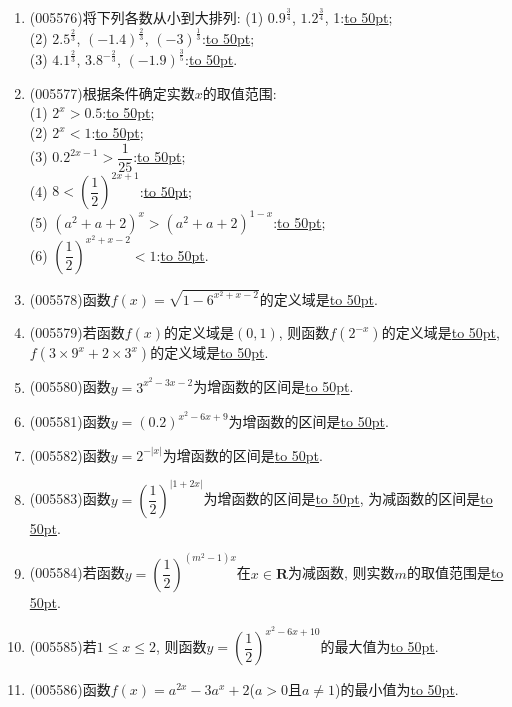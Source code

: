 \documentclass[10pt,a4paper]{article}
\newcommand{\blank}[1]{\underline{\hbox to #1pt{}}}
\begin{document}
\begin{enumerate}[1.]
(1) $1.2^{0.3}$\blank{50}$1$;\\
(2) $0.3^{5.1}$\blank{50}$1$;\\
(3) $(\dfrac 23)^{-\frac 13}$\blank{50}$(\dfrac 32)^{-\frac 13}$;\\
(4) $9^{\frac 13}$\blank{50}$3^{\frac 43}$;\\
(5) $2^{\frac 23}$\blank{50}$3.6^{-\frac 34}$;\\
(6) $0.8^{-2}$\blank{50}$(\dfrac 53)^{-\frac 12}$.
\item {\tiny (005576)}将下列各数从小到大排列:
(1) $0.9^{\frac 34}$, $1.2^{\frac 34}$, 1:\blank{50};\\
(2) $2.5^{\frac 23}$, $(-1.4)^{\frac 23}$, $(-3)^{\frac 13}$:\blank{50};\\
(3) $4.1^{\frac 23}$, $3.8^{-\frac 23}$, $(-1.9)^{\frac 35}$:\blank{50}.
\item {\tiny (005577)}根据条件确定实数$x$的取值范围:\\
(1) $2^x>0.5$:\blank{50};\\
(2) $2^x<1$:\blank{50};\\
(3) $0.2^{2x-1}>\dfrac 1{25}$:\blank{50};\\
(4) $8<(\dfrac 12)^{2x+1}$:\blank{50};\\
(5) $(a^2+a+2)^x>(a^2+a+2)^{1-x}$:\blank{50};\\
(6) $(\dfrac 12)^{x^2+x-2}<1$:\blank{50}.
\item {\tiny (005578)}函数$f(x)=\sqrt {1-6^{x^2+x-2}}$的定义域是\blank{50}.
\item {\tiny (005579)}若函数$f(x)$的定义域是$(0, 1)$, 则函数$f(2^{-x})$的定义域是\blank{50}, $f(3\times 9^x+2\times 3^x)$的定义域是\blank{50}.
\item {\tiny (005580)}函数$y=3^{x^2-3x-2}$为增函数的区间是\blank{50}.
\item {\tiny (005581)}函数$y=(0.2)^{x^2-6x+9}$为增函数的区间是\blank{50}.
\item {\tiny (005582)}函数$y=2^{-|x|}$为增函数的区间是\blank{50}.
\item {\tiny (005583)}函数$y=(\dfrac 12)^{|1+2x|}$为增函数的区间是\blank{50}, 为减函数的区间是\blank{50}.
\item {\tiny (005584)}若函数$y=(\dfrac 12)^{(m^2-1)x}$在$x\in \mathbf{R}$为减函数, 则实数$m$的取值范围是\blank{50}.
\item {\tiny (005585)}若$1\le x\le 2$, 则函数$y=(\dfrac 12)^{x^2-6x+10}$的最大值为\blank{50}.
\item {\tiny (005586)}函数$f(x)=a^{2x}-3a^x+2$($a>0$且$a\ne 1$)的最小值为\blank{50}.

\end{enumerate}
\end{document}
